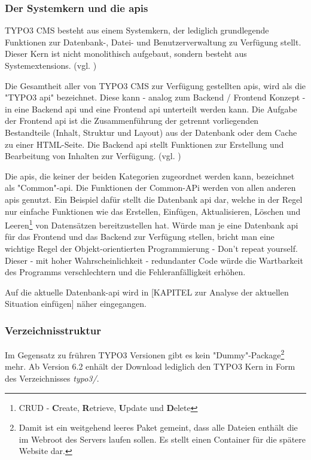 \subsubsection{Der Systemkern und die \gls{api}s}
TYPO3 CMS besteht aus einem Systemkern, der lediglich grundlegende Funktionen zur Datenbank-, Datei- und Benutzerverwaltung zu Verfügung stellt. Dieser Kern ist nicht monolithisch aufgebaut, sondern besteht aus Systemextensions. (vgl. \cite[S. 32]{book:laborenzTypo32006})

Die Gesamtheit aller von TYPO3 CMS zur Verfügung gestellten \gls{api}s, wird als die "TYPO3 \gls{api}" bezeichnet. Diese kann - analog zum Backend / Frontend Konzept - in eine Backend \gls{api} und eine Frontend \gls{api} unterteilt werden kann. Die Aufgabe der Frontend \gls{api} ist die Zusammenführung der getrennt vorliegenden Bestandteile (Inhalt, Struktur und Layout) aus der Datenbank oder dem Cache zu einer HTML-Seite. Die Backend \gls{api} stellt Funktionen zur Erstellung und Bearbeitung von Inhalten zur Verfügung. (vgl. \cite[S. 5 ff.]{book:dulepovTypo32008})

Die \gls{api}s, die keiner der beiden Kategorien zugeordnet werden kann, bezeichnet \cite[S. 5 ff.]{book:dulepovTypo32008} als "Common"-\gls{api}. Die Funktionen der Common-APi werden von allen anderen \gls{api}s genutzt. Ein Beispiel dafür stellt die Datenbank \gls{api} dar, welche in der Regel nur einfache Funktionen wie das Erstellen, Einfügen, Aktualisieren, Löschen und Leeren\footnote{CRUD - {\bfseries C}reate, {\bfseries R}etrieve, {\bfseries U}pdate und {\bfseries D}elete} von Datensätzen bereitzustellen hat. Würde man je eine Datenbank \gls{api} für das Frontend und das Backend zur Verfügung stellen, bricht man eine wichtige Regel der Objekt-orientierten Programmierung - Don't repeat yourself. Dieser - mit hoher Wahrscheinlichkeit - redundanter Code würde die Wartbarkeit des Programms verschlechtern und die Fehleranfälligkeit erhöhen.

Auf die aktuelle Datenbank-\gls{api} wird in [KAPITEL zur Analyse der aktuellen Situation einfügen] näher eingegangen.

\subsubsection{Verzeichnisstruktur}

Im Gegensatz zu frühren TYPO3 Versionen gibt es kein "Dummy"-Package\footnote{Damit ist ein weitgehend leeres Paket gemeint, dass alle Dateien enthält die im Web\-root des Servers laufen sollen. Es stellt einen Container für die spätere Website dar.} mehr. Ab Version 6.2 enhält der Download lediglich den TYPO3 Kern in Form des Verzeichnisses \textit{typo3/}.


